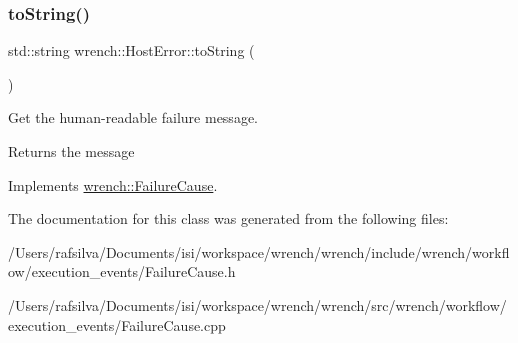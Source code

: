 \subsubsection{\texorpdfstring{to\+String()}{toString()}}
{\footnotesize\ttfamily std\+::string wrench\+::\+Host\+Error\+::to\+String (\begin{DoxyParamCaption}{ }\end{DoxyParamCaption})\hspace{0.3cm}{\ttfamily [virtual]}}



Get the human-\/readable failure message. 

\begin{DoxyReturn}{Returns}
the message 
\end{DoxyReturn}


Implements \hyperlink{classwrench_1_1_failure_cause_afbad248ebe902409f2cd4f1d6f2b867d}{wrench\+::\+Failure\+Cause}.



The documentation for this class was generated from the following files\+:\begin{DoxyCompactItemize}
\item 
/\+Users/rafsilva/\+Documents/isi/workspace/wrench/wrench/include/wrench/workflow/execution\+\_\+events/Failure\+Cause.\+h\item 
/\+Users/rafsilva/\+Documents/isi/workspace/wrench/wrench/src/wrench/workflow/execution\+\_\+events/Failure\+Cause.\+cpp\end{DoxyCompactItemize}
